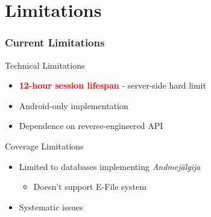 \documentclass[aspectratio=169,11pt]{beamer}
\begin{document}
\section{Limitations}

\begin{frame}
\frametitle{Current Limitations}
\begin{block}{Technical Limitations}
\begin{itemize}
    \item \textcolor{red}{\textbf{12-hour session lifespan}} - server-side hard limit
    \item Android-only implementation
    \item Dependence on reverse-engineered API
\end{itemize}
\end{block}

\begin{block}{Coverage Limitations}
\begin{itemize}
    \item Limited to databases implementing \textit{Andmejälgija}
    \begin{itemize}
        \item Doesn't support E-File system
    \end{itemize}

\end{itemize}
\end{block}

\begin{itemize}
    \item Systematic issues
\end{itemize}

\end{frame}
\end{document}
